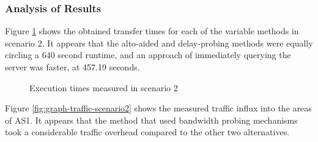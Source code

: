 \subsubsection{Analysis of Results}

Figure \ref{fig:graph-execution-scenario2} shows the obtained transfer times for each of the variable methods in scenario 2.
It appears that the \gls{alto}-aided and delay-probing methods were equally circling a 640 second runtime, and an approach of immediately querying the server was faster, at 457.19 seconds.

\begin{figure}[H]
\centering
{} %
\caption{Execution times measured in scenario 2}
\label{fig:graph-execution-scenario2}
\end{figure}

Figure \ref{fig:graph-traffic-scenario2} shows the measured traffic influx into the areas of AS1.
It appears that the method that used bandwidth probing mechanisms took a considerable traffic overhead compared to the other two alternatives.

